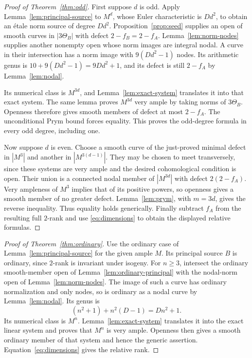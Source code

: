 \documentclass[11pt]{article}
\theoremstyle{definition}\newtheorem{definition}[theorem]{Definition}
\theoremstyle{remark}\newtheorem{remark}[theorem]{Remark}
\begin{document}
\begin{proof}[Proof of Theorem~\ref{thm:odd}]
First suppose $d$ is odd. Apply Lemma~\ref{lem:principal-source} to $M^d$, whose Euler characteristic is $Dd^2$, to obtain an \'etale norm source of degree $Dd^2$. Proposition~\ref{prop:seed} supplies an open of smooth curves in $|3\Theta_B|$ with defect $2-f_B=2-f_A$. Lemma~\ref{lem:norm-nodes} supplies another nonempty open whose norm images are integral nodal. A curve in their intersection has a norm image with $9(Dd^2-1)$ nodes. Its arithmetic genus is $10+9(Dd^2-1)=9Dd^2+1$, and its defect is still $2-f_A$ by Lemma~\ref{lem:nodal}.

Its numerical class is $M^{3d}$, and Lemma~\ref{lem:exact-system} translates it into that exact system. The same lemma proves $M^{3d}$ very ample by taking norms of $3\Theta_B$. Openness therefore gives smooth members of defect at most $2-f_A$. The unconditional Prym bound forces equality. This proves the odd-degree formula in every odd degree, including one.

Now suppose $d$ is even. Choose a smooth curve of the just-proved minimal defect in $|M^3|$ and another in $|M^{3(d-1)}|$. They may be chosen to meet transversely, since these systems are very ample and the desired cohomological condition is open. Their union is a connected nodal member of $|M^{3d}|$ with defect $2(2-f_A)$. Very ampleness of $M^3$ implies that of its positive powers, so openness gives a smooth member of no greater defect. Lemma~\ref{lem:prym}, with $m=3d$, gives the reverse inequality. Thus equality holds generically. Finally subtract $f_A$ from the resulting full $2$-rank and use \eqref{eq:dimensions} to obtain the displayed relative formulas.
\end{proof}

\begin{proof}[Proof of Theorem~\ref{thm:ordinary}]
Use the ordinary case of Lemma~\ref{lem:principal-source} for the given ample $M$. Its principal source $B$ is ordinary, since $2$-rank is invariant under isogeny. For $n\ge3$, intersect the ordinary smooth-member open of Lemma~\ref{lem:ordinary-principal} with the nodal-norm open of Lemma~\ref{lem:norm-nodes}. The image of such a curve has ordinary normalization and only nodes, so is ordinary as a nodal curve by Lemma~\ref{lem:nodal}. Its genus is
\[
 (n^2+1)+n^2(D-1)=Dn^2+1.
\]
Its numerical class is $M^n$. Lemma~\ref{lem:exact-system} translates it into the exact linear system and proves that $M^n$ is very ample. Openness then gives a smooth ordinary member of that system and hence the generic assertion. Equation~\eqref{eq:dimensions} gives the relative rank.
\end{proof}
\end{document}
